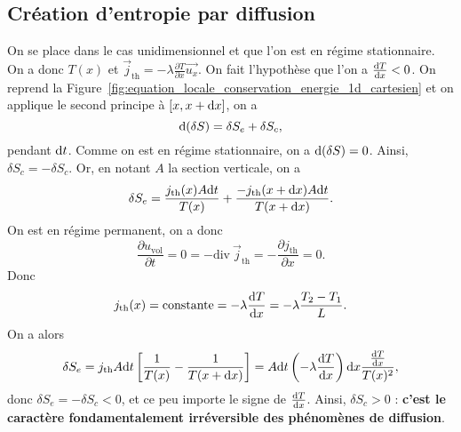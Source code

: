     \subsection{Création d'entropie par diffusion}
            
        On se place dans le cas unidimensionnel et que l'on est en régime stationnaire. On a donc $T(x)$ et $\vec{j}_{\text{th}}=-\lambda\frac{\partial T}{\partial x}\vec{u_x}$. On fait l'hypothèse que l'on a $\frac{\mathrm{d} T}{\mathrm{d} x}<0$. On reprend la Figure~\ref{fig:equation_locale_conservation_energie_1d_cartesien} et on applique le second principe à $[x,x+\mathrm{d} x]$, on a 
        \begin{equation}
            \mathrm{d}(\delta S)=\delta S_e+\delta S_c,
        \end{equation}
        pendant $\mathrm{d} t$. Comme on est en régime stationnaire, on a $\mathrm{d}(\delta S)=0$. Ainsi, $\delta S_c=-\delta S_c$. Or, en notant $A$ la section verticale, on a
        \begin{equation}
            \delta S_e=\frac{j_{\text{th}}(x) A\mathrm{d} t}{T(x)}+\frac{-j_{\text{th}}(x+\mathrm{d} x)A\mathrm{d} t}{T(x+\mathrm{d} x)}.
        \end{equation}
        On est en régime permanent, on a donc
        \begin{equation}
            \frac{\partial u_{\text{vol}}}{\partial t}=0=-\mathrm{div}~\vec{j}_{\text{th}}=-\frac{\partial j_{\text{th}}}{\partial x}=0.
        \end{equation}
        Donc 
        \begin{equation}
            j_{\text{th}}(x)=\mathrm{constante}=-\lambda\frac{\mathrm{d} T}{\mathrm{d} x}=-\lambda\frac{T_2-T_1}{L}.
        \end{equation}
        On a alors
        \begin{equation}
            \delta S_e
            =j_{\text{th}}A\mathrm{d} t\left[
                \frac{1}{T(x)}-\frac{1}{T(x+\mathrm{d} x)}
            \right]=A\mathrm{d} t\left(-\lambda\frac{\mathrm{d} T}{\mathrm{d} x}\right)\mathrm{d} x\frac{\frac{\mathrm{d} T}{\mathrm{d} x}}{T(x)^{2}},
        \end{equation}
        donc $\delta S_e=-\delta S_c<0$, et ce peu importe le signe de $\frac{\mathrm{d} T}{\mathrm{d} x}$. Ainsi, $\delta S_c>0$ : \textbf{c'est le caractère fondamentalement irréversible des phénomènes de diffusion}.